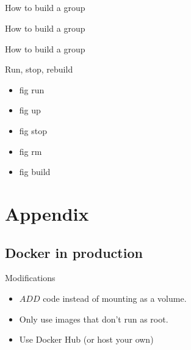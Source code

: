 \documentclass{beamer}
\begin{document}
    \subsection{}
    \begin{frame}{How to build a group}
        \lstFigYmlNginx
    \end{frame}
    \begin{frame}{How to build a group}
        \lstFigYmlPhpFpm
    \end{frame}
    \begin{frame}{How to build a group}
        \lstFigYmlMysql
    \end{frame}
    \begin{frame}{Run, stop, rebuild}
        \begin{itemize}
            \item fig run
            \item fig up
            \item fig stop
            \item fig rm
            \item fig build
        \end{itemize}
    \end{frame}
    \section{Appendix}
    \subsection{Docker in production}
    \begin{frame}{Modifications}
        \begin{itemize}
            \item $ADD$ code instead of mounting as a volume.
            \item Only use images that don't run as root.
            \item Use Docker Hub (or host your own)
        \end{itemize}
    \end{frame}
\end{document}
